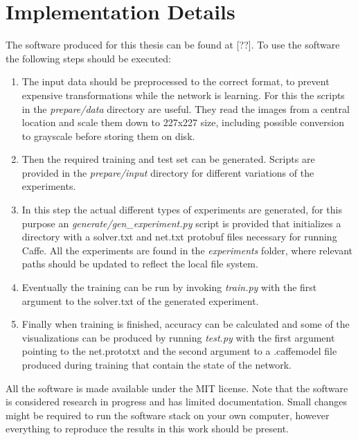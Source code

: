 %
\chapter{Implementation Details}
\label{app:implementation_details}

The software produced for this thesis can be found at [??]. To use the software the following steps should be executed:
\begin{enumerate}
\item The input data should be preprocessed to the correct format, to prevent expensive transformations while the network is learning. For this the scripts in the \textit{prepare/data} directory are useful. They read the images from a central location and scale them down to 227x227 size, including possible conversion to grayscale before storing them on disk.
\item Then the required training and test set can be generated. Scripts are provided in the \textit{prepare/input} directory for different variations of the experiments.
\item In this step the actual different types of experiments are generated, for this purpose an \textit{generate/gen\_experiment.py} script is provided that initializes a directory with a solver.txt and net.txt protobuf files necessary for running Caffe. All the experiments are found in the \textit{experiments} folder, where relevant paths should be updated to reflect the local file system.
\item Eventually the training can be run by invoking \textit{train.py} with the first argument to the solver.txt of the generated experiment. 
\item Finally when training is finished, accuracy can be calculated and some of the visualizations can be produced by running \textit{test.py} with the first argument pointing to the net.prototxt and the second argument to a .caffemodel file produced during training that contain the state of the network.
\end{enumerate}
All the software is made available under the MIT license. Note that the software is considered research in progress and has limited documentation. Small changes might be required to run the software stack on your own computer, however everything to reproduce the results in this work should be present.

